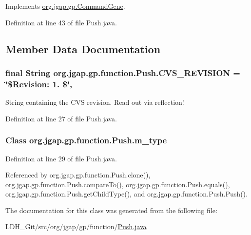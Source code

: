 Implements \hyperlink{classorg_1_1jgap_1_1gp_1_1_command_gene_a236141d99059da808afe7a9217e411c7}{org.\-jgap.\-gp.\-Command\-Gene}.



Definition at line 43 of file Push.\-java.



\subsection{Member Data Documentation}
\hypertarget{classorg_1_1jgap_1_1gp_1_1function_1_1_push_a49c4d90a18c8b5a550944c21cc404729}{
\subsubsection[{C\-V\-S\-\_\-\-R\-E\-V\-I\-S\-I\-O\-N}]{\setlength{\rightskip}{0pt plus 5cm}final String org.\-jgap.\-gp.\-function.\-Push.\-C\-V\-S\-\_\-\-R\-E\-V\-I\-S\-I\-O\-N = \char`\"{}\$Revision\-: 1. \$\char`\"{}\hspace{0.3cm}{\ttfamily [static]}, {\ttfamily [private]}}}\label{classorg_1_1jgap_1_1gp_1_1function_1_1_push_a49c4d90a18c8b5a550944c21cc404729}
String containing the C\-V\-S revision. Read out via reflection! 

Definition at line 27 of file Push.\-java.

\hypertarget{classorg_1_1jgap_1_1gp_1_1function_1_1_push_af287dc33b99fa32225734a9b820e6227}{
\subsubsection[{m\-\_\-type}]{\setlength{\rightskip}{0pt plus 5cm}Class org.\-jgap.\-gp.\-function.\-Push.\-m\-\_\-type\hspace{0.3cm}{\ttfamily [private]}}}\label{classorg_1_1jgap_1_1gp_1_1function_1_1_push_af287dc33b99fa32225734a9b820e6227}


Definition at line 29 of file Push.\-java.



Referenced by org.\-jgap.\-gp.\-function.\-Push.\-clone(), org.\-jgap.\-gp.\-function.\-Push.\-compare\-To(), org.\-jgap.\-gp.\-function.\-Push.\-equals(), org.\-jgap.\-gp.\-function.\-Push.\-get\-Child\-Type(), and org.\-jgap.\-gp.\-function.\-Push.\-Push().



The documentation for this class was generated from the following file\-:\begin{DoxyCompactItemize}
\item 
L\-D\-H\-\_\-\-Git/src/org/jgap/gp/function/\hyperlink{_push_8java}{Push.\-java}\end{DoxyCompactItemize}
